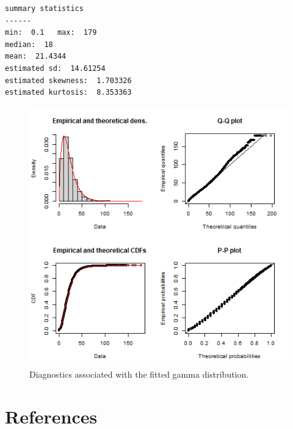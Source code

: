 \documentclass[]{elsarticle} %
\begin{document}
\begin{verbatim}
summary statistics
------
min:  0.1   max:  179 
median:  18 
mean:  21.4344 
estimated sd:  14.61254 
estimated skewness:  1.703326 
estimated kurtosis:  8.353363 
\end{verbatim}

\begin{figure}
\includegraphics[width=1\linewidth]{images/impedance_function} \caption{\label{fig:impedance-function-plot}Diagnostics associated with the fitted gamma distribution.}\label{fig:plot-impedance-function}
\end{figure}

\hypertarget{references}{%
\section*{References}\label{references}}
\end{document}
